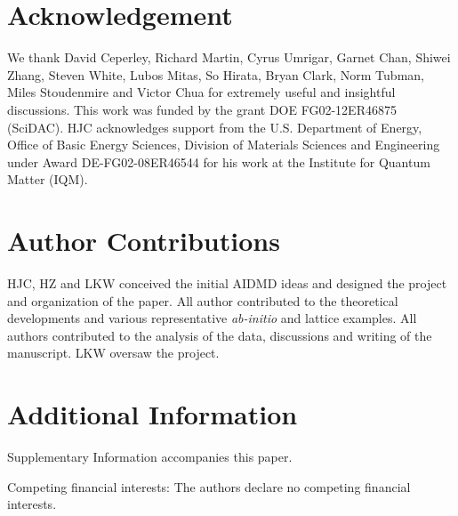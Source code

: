 \section{Acknowledgement} 
We thank  David Ceperley,  Richard Martin, Cyrus Umrigar,  Garnet Chan,  Shiwei Zhang, Steven White,  
Lubos Mitas, So Hirata, Bryan Clark, Norm Tubman, Miles Stoudenmire and Victor Chua for extremely useful and insightful discussions. 
This work was funded by the grant DOE FG02-12ER46875 (SciDAC). HJC acknowledges support from the U.S. Department of Energy, 
Office of Basic Energy Sciences, Division of Materials Sciences and Engineering under Award DE-FG02-08ER46544 for his work at the Institute for Quantum Matter (IQM). 

\section*{Author Contributions}
HJC, HZ and LKW conceived the initial AIDMD ideas and designed the project and organization of the paper. 
All author contributed to the theoretical developments and various representative \textit{ab-initio} and lattice examples. 
All authors contributed to the analysis of the data, discussions and writing of the manuscript. 
LKW oversaw the project. 
 
\section*{Additional Information}
Supplementary Information accompanies this paper.

Competing financial interests: The authors declare no competing financial interests.


